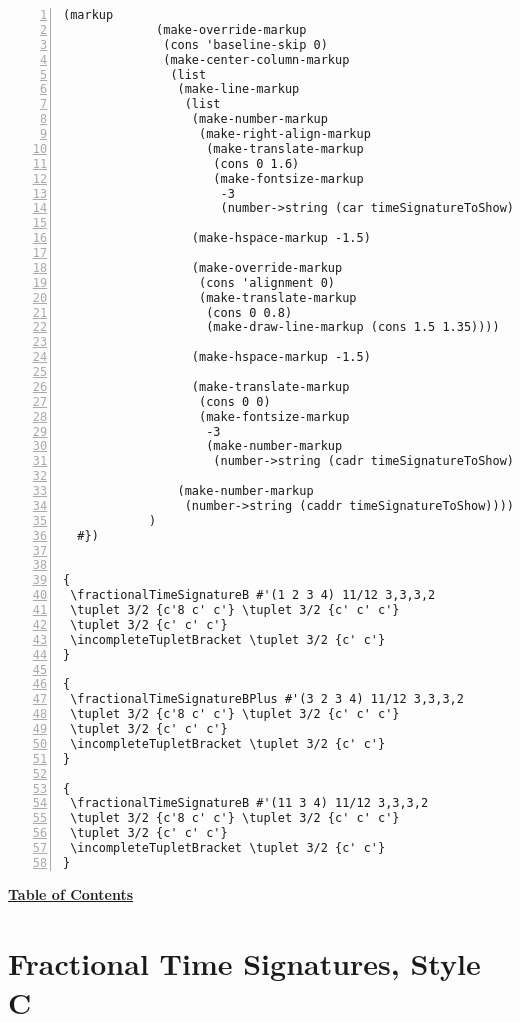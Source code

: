 \begin{Verbatim}[numbers=left,xleftmargin=5mm]
            (markup
             (make-override-markup
              (cons 'baseline-skip 0)
              (make-center-column-markup
               (list
                (make-line-markup
                 (list
                  (make-number-markup
                   (make-right-align-markup
                    (make-translate-markup
                     (cons 0 1.6)
                     (make-fontsize-markup
                      -3
                      (number->string (car timeSignatureToShow))))))

                  (make-hspace-markup -1.5)

                  (make-override-markup
                   (cons 'alignment 0)
                   (make-translate-markup
                    (cons 0 0.8)
                    (make-draw-line-markup (cons 1.5 1.35))))

                  (make-hspace-markup -1.5)

                  (make-translate-markup
                   (cons 0 0)
                   (make-fontsize-markup
                    -3
                    (make-number-markup
                     (number->string (cadr timeSignatureToShow)))))))

                (make-number-markup
                 (number->string (caddr timeSignatureToShow)))))))
            )
  #})


{
 \fractionalTimeSignatureB #'(1 2 3 4) 11/12 3,3,3,2
 \tuplet 3/2 {c'8 c' c'} \tuplet 3/2 {c' c' c'}
 \tuplet 3/2 {c' c' c'}
 \incompleteTupletBracket \tuplet 3/2 {c' c'}
}

{
 \fractionalTimeSignatureBPlus #'(3 2 3 4) 11/12 3,3,3,2
 \tuplet 3/2 {c'8 c' c'} \tuplet 3/2 {c' c' c'}
 \tuplet 3/2 {c' c' c'}
 \incompleteTupletBracket \tuplet 3/2 {c' c'}
}

{
 \fractionalTimeSignatureB #'(11 3 4) 11/12 3,3,3,2
 \tuplet 3/2 {c'8 c' c'} \tuplet 3/2 {c' c' c'}
 \tuplet 3/2 {c' c' c'}
 \incompleteTupletBracket \tuplet 3/2 {c' c'}
}
\end{Verbatim}

\hyperref[sec:toc]{\textbf{Table of Contents}}

\vfill \break




\section {Fractional Time Signatures, Style C}

